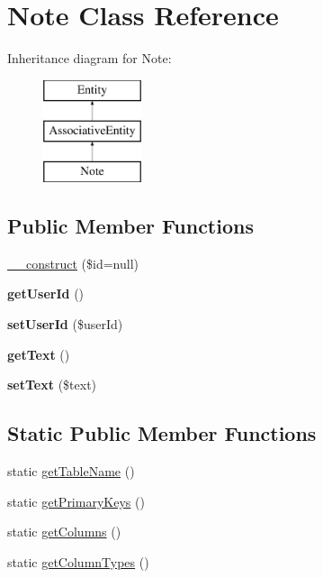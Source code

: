 \hypertarget{classNote}{
\section{Note Class Reference}
\label{classNote}
}
Inheritance diagram for Note:\begin{figure}[H]
\begin{center}
\leavevmode
\includegraphics[height=3.000000cm]{classNote}
\end{center}
\end{figure}
\subsection*{Public Member Functions}
\begin{DoxyCompactItemize}
\item 
\hyperlink{classNote_ae60466bb5611822f5fa13ca5ee45af8c}{\_\-\_\-construct} (\$id=null)
\item 
\hypertarget{classNote_ad2e8b55360b22ba5ac67819cc2661804}{
{\bfseries getUserId} ()}
\label{classNote_ad2e8b55360b22ba5ac67819cc2661804}

\item 
\hypertarget{classNote_a5b1e254c6edc00b324142fd66cc4b286}{
{\bfseries setUserId} (\$userId)}
\label{classNote_a5b1e254c6edc00b324142fd66cc4b286}

\item 
\hypertarget{classNote_a849b7537b5b6a6b94758169962b94c1a}{
{\bfseries getText} ()}
\label{classNote_a849b7537b5b6a6b94758169962b94c1a}

\item 
\hypertarget{classNote_a795ea371b66cfd09b4f94a6c72e041ee}{
{\bfseries setText} (\$text)}
\label{classNote_a795ea371b66cfd09b4f94a6c72e041ee}

\end{DoxyCompactItemize}
\subsection*{Static Public Member Functions}
\begin{DoxyCompactItemize}
\item 
static \hyperlink{classNote_a83deedb316c670baa4b31c8d512e6af6}{getTableName} ()
\item 
static \hyperlink{classNote_a72d5489c580726d4fbb55359ae98db5a}{getPrimaryKeys} ()
\item 
static \hyperlink{classNote_ab602c2348fab90e66d061b62c2eb0aac}{getColumns} ()
\item 
static \hyperlink{classNote_afb67f78e11e21140b15735ce5a78d5ba}{getColumnTypes} ()
\end{DoxyCompactItemize}
